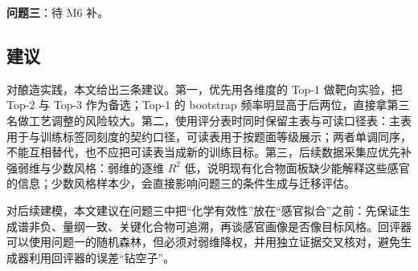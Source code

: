 \textbf{问题三}：待 M6 补。

\subsection{建议}

对酿造实践，本文给出三条建议。第一，优先用各维度的 Top-1 做靶向实验，把 Top-2 与 Top-3 作为备选；Top-1 的 bootstrap 频率明显高于后两位，直接拿第三名做工艺调整的风险较大。第二，使用评分表时同时保留主表与可读口径表：主表用于与训练标签同刻度的契约口径，可读表用于按题面等级展示；两者单调同序，不能互相替代，也不应把可读表当成新的训练目标。第三，后续数据采集应优先补强弱维与少数风格：弱维的逐维 $R^2$ 低，说明现有化合物面板缺少能解释这些感官的信息；少数风格样本少，会直接影响问题三的条件生成与迁移评估。

对后续建模，本文建议在问题三中把“化学有效性”放在“感官拟合”之前：先保证生成谱非负、量纲一致、关键化合物可追溯，再谈感官画像是否像目标风格。回评器可以使用问题一的随机森林，但必须对弱维降权，并用独立证据交叉核对，避免生成器利用回评器的误差“钻空子”。
